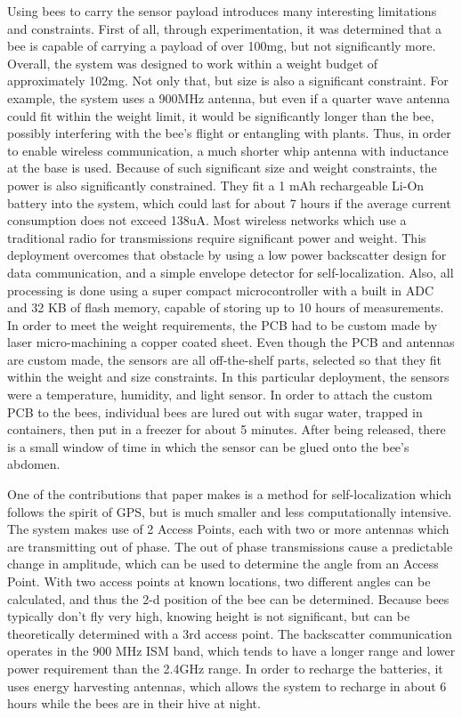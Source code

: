 \documentclass[letterpaper,twocolumn,10pt]{article}
\begin{document}
Using bees to carry the sensor payload introduces many interesting limitations and constraints. First of all, through experimentation, it was determined that a bee is capable of carrying a payload of over 100mg, but not significantly more. Overall, the system was designed to work within a weight budget of approximately 102mg. Not only that, but size is also a significant constraint. For example, the system uses a 900MHz antenna, but even if a quarter wave antenna could fit within the weight limit, it would be significantly longer than the bee, possibly interfering with the bee's flight or entangling with plants. Thus, in order to enable wireless communication, a much shorter whip antenna with inductance at the base is used. Because of such significant size and weight constraints, the power is also significantly constrained. They fit a 1 mAh rechargeable Li-On battery into the system, which could last for about 7 hours if the average current consumption does not exceed 138uA. Most wireless networks which use a traditional radio for transmissions require significant power and weight. This deployment overcomes that obstacle by using a low power backscatter design for data communication, and a simple envelope detector for self-localization. Also, all processing is done using a super compact microcontroller with a built in ADC and 32 KB of flash memory, capable of storing up to 10 hours of measurements. In order to meet the weight requirements, the PCB had to be custom made by laser micro-machining a copper coated sheet. Even though the PCB and antennas are custom made, the sensors are all off-the-shelf parts, selected so that they fit within the weight and size constraints. In this particular deployment, the sensors were a temperature, humidity, and light sensor. In order to attach the custom PCB to the bees, individual bees are lured out with sugar water, trapped in containers, then put in a freezer for about 5 minutes. After being released, there is a small window of time in which the sensor can be glued onto the bee's abdomen.

One of the contributions that paper makes is a method for self-localization which follows the spirit of GPS, but is much smaller and less computationally intensive. The system makes use of 2 Access Points, each with two or more antennas which are transmitting out of phase. The out of phase transmissions cause a predictable change in amplitude, which can be used to determine the angle from an Access Point. With two access points at known locations, two different angles can be calculated, and thus the 2-d position of the bee can be determined. Because bees typically don't fly very high, knowing height is not significant, but can be theoretically determined with a 3rd access point. The backscatter communication operates in the 900 MHz ISM band, which tends to have a longer range and lower power requirement than the 2.4GHz range. In order to recharge the batteries, it uses energy harvesting antennas, which allows the system to recharge in about 6 hours while the bees are in their hive at night.
\end{document}

